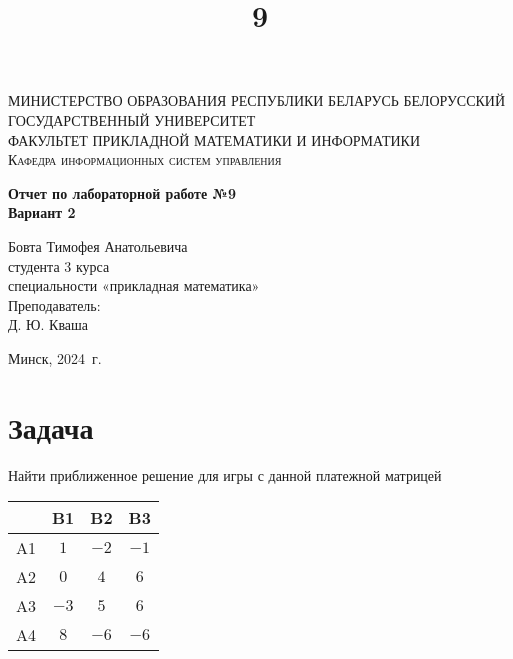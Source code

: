 \documentclass[11pt]{article}
\title{9}
\begin{document}
    
    \begin{titlepage}
    	\begin{center}
    		\textsc{МИНИСТЕРСТВО ОБРАЗОВАНИЯ РЕСПУБЛИКИ БЕЛАРУСЬ БЕЛОРУССКИЙ ГОСУДАРСТВЕННЫЙ УНИВЕРСИТЕТ
    			\\[5mm]
    			ФАКУЛЬТЕТ ПРИКЛАДНОЙ МАТЕМАТИКИ И ИНФОРМАТИКИ\\[2mm]
    			Кафедра информационных систем управления
    		}
    		
    		\vfill
    		
    		\textbf{Отчет по лабораторной работе №9\\
    			Вариант 2
    			\\[26mm]
    		}
    	\end{center}
    	
    	\hfill
    	\begin{minipage}{.5\textwidth}
    		\begin{flushright}
    			Бовта Тимофея Анатольевича\\
    			студента 3 курса\\
    			специальности «прикладная математика»\\[5mm]
    			
    			Преподаватель:\\[2mm] 
    			Д. Ю. Кваша\\
    		\end{flushright}
    	\end{minipage}%
    	\vfill
    	\begin{center}
    		Минск, 2024\ г.
    	\end{center}
    \end{titlepage}
    
    

    
    \section{Задача}\label{ux437ux430ux434ux430ux447ux430}

    Найти приближенное решение для игры с данной платежной матрицей

\begin{table}[h]
\centering
\begin{tabular}{|c|c|c|c|}
\hline
     & B1 & B2 & B3 \\
\hline
A1 & $1$ & $-2$ & $-1$ \\
\hline
A2 & $0$ & $4$ & $6$ \\
\hline
A3 & $-3$ & $5$ & $6$ \\
\hline
A4 & $8$ & $-6$ & $-6$ \\
\hline
\end{tabular}
\end{table}
\end{document}
